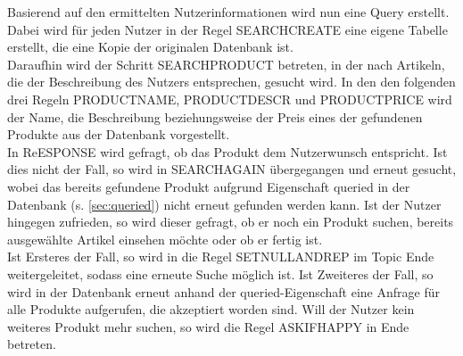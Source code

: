 Basierend auf den ermittelten Nutzerinformationen wird nun eine Query erstellt. Dabei wird für jeden Nutzer in der Regel SEARCHCREATE eine eigene Tabelle erstellt, die eine Kopie der originalen Datenbank ist.\\
Daraufhin wird der Schritt SEARCHPRODUCT betreten, in der nach Artikeln, die der Beschreibung des Nutzers entsprechen, gesucht wird. In den den folgenden drei Regeln PRODUCTNAME, PRODUCTDESCR und PRODUCTPRICE wird der Name, die Beschreibung beziehungsweise der Preis eines der gefundenen Produkte aus der Datenbank vorgestellt.\\
In ReESPONSE wird gefragt, ob das Produkt dem Nutzerwunsch entspricht. Ist dies nicht der Fall, so wird in SEARCHAGAIN übergegangen und erneut gesucht, wobei das bereits gefundene Produkt aufgrund Eigenschaft queried in der Datenbank (s. \ref{sec:queried}) nicht erneut gefunden werden kann. Ist der Nutzer hingegen zufrieden, so wird dieser gefragt, ob er noch ein Produkt suchen, bereits ausgewählte Artikel einsehen möchte oder ob er fertig ist.\\
Ist Ersteres der Fall, so wird in die Regel SETNULLANDREP im Topic Ende weitergeleitet, sodass eine erneute Suche möglich ist. Ist Zweiteres der Fall, so wird in der Datenbank erneut anhand der queried-Eigenschaft eine Anfrage für alle Produkte aufgerufen, die akzeptiert worden sind. Will der Nutzer kein weiteres Produkt mehr suchen, so wird die Regel ASKIFHAPPY in Ende betreten.  
